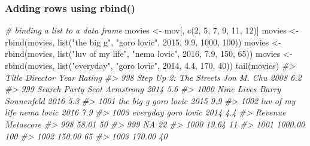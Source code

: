 \documentclass[
]{book}
\newenvironment{Shaded}{\begin{snugshade}}{\end{snugshade}}
\newcommand{\CommentTok}[1]{\textcolor[rgb]{0.56,0.35,0.01}{\textit{#1}}}
\newcommand{\DecValTok}[1]{\textcolor[rgb]{0.00,0.00,0.81}{#1}}
\newcommand{\FloatTok}[1]{\textcolor[rgb]{0.00,0.00,0.81}{#1}}
\newcommand{\FunctionTok}[1]{\textcolor[rgb]{0.00,0.00,0.00}{#1}}
\newcommand{\NormalTok}[1]{#1}
\newcommand{\OtherTok}[1]{\textcolor[rgb]{0.56,0.35,0.01}{#1}}
\newcommand{\StringTok}[1]{\textcolor[rgb]{0.31,0.60,0.02}{#1}}
\begin{document}
\hypertarget{adding-rows-using-rbind}{%
\subsubsection{Adding rows using rbind()}\label{adding-rows-using-rbind}}

\begin{Shaded}
\begin{Highlighting}[]
\CommentTok{\# binding a list to a data frame}
\NormalTok{movies }\OtherTok{\textless{}{-}}\NormalTok{ mov[, }\FunctionTok{c}\NormalTok{(}\DecValTok{2}\NormalTok{, }\DecValTok{5}\NormalTok{, }\DecValTok{7}\NormalTok{, }\DecValTok{9}\NormalTok{, }\DecValTok{11}\NormalTok{, }\DecValTok{12}\NormalTok{)]}
\NormalTok{movies }\OtherTok{\textless{}{-}} \FunctionTok{rbind}\NormalTok{(movies, }\FunctionTok{list}\NormalTok{(}\StringTok{"the big g"}\NormalTok{, }\StringTok{"goro lovic"}\NormalTok{, }\DecValTok{2015}\NormalTok{, }\FloatTok{9.9}\NormalTok{, }\DecValTok{1000}\NormalTok{, }\DecValTok{100}\NormalTok{))}
\NormalTok{movies }\OtherTok{\textless{}{-}} \FunctionTok{rbind}\NormalTok{(movies, }\FunctionTok{list}\NormalTok{(}\StringTok{"luv of my life"}\NormalTok{, }\StringTok{"nema lovic"}\NormalTok{, }\DecValTok{2016}\NormalTok{, }\FloatTok{7.9}\NormalTok{, }\DecValTok{150}\NormalTok{, }\DecValTok{65}\NormalTok{))}
\NormalTok{movies }\OtherTok{\textless{}{-}} \FunctionTok{rbind}\NormalTok{(movies, }\FunctionTok{list}\NormalTok{(}\StringTok{"everyday"}\NormalTok{, }\StringTok{"goro lovic"}\NormalTok{, }\DecValTok{2014}\NormalTok{, }\FloatTok{4.4}\NormalTok{, }\DecValTok{170}\NormalTok{, }\DecValTok{40}\NormalTok{))}
\FunctionTok{tail}\NormalTok{(movies)}
\CommentTok{\#\textgreater{}                       Title         Director Year Rating}
\CommentTok{\#\textgreater{} 998  Step Up 2: The Streets       Jon M. Chu 2008    6.2}
\CommentTok{\#\textgreater{} 999            Search Party   Scot Armstrong 2014    5.6}
\CommentTok{\#\textgreater{} 1000             Nine Lives Barry Sonnenfeld 2016    5.3}
\CommentTok{\#\textgreater{} 1001              the big g       goro lovic 2015    9.9}
\CommentTok{\#\textgreater{} 1002         luv of my life       nema lovic 2016    7.9}
\CommentTok{\#\textgreater{} 1003               everyday       goro lovic 2014    4.4}
\CommentTok{\#\textgreater{}      Revenue Metascore}
\CommentTok{\#\textgreater{} 998    58.01        50}
\CommentTok{\#\textgreater{} 999       NA        22}
\CommentTok{\#\textgreater{} 1000   19.64        11}
\CommentTok{\#\textgreater{} 1001 1000.00       100}
\CommentTok{\#\textgreater{} 1002  150.00        65}
\CommentTok{\#\textgreater{} 1003  170.00        40}


\end{Highlighting}
\end{Shaded}
\end{document}
